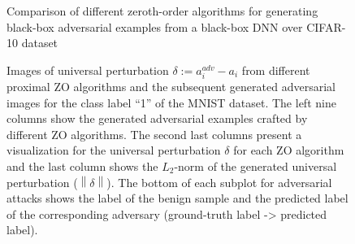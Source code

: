 \documentclass[iicol,sn-basic]{sn-jnl}
\theoremstyle{thmstyleone}%
\theoremstyle{thmstyletwo}%
\theoremstyle{thmstylethree}%
\newcommand{\norm}[1]{\left\lVert#1\right\rVert}
\begin{document}
\begin{figure}[hbt!]
\hfill%
%
\setlength{\abovecaptionskip}{2pt}
\caption{Comparison of different zeroth-order algorithms for generating black-box adversarial examples from a black-box DNN over CIFAR-10 dataset}
\label{attack-fig-cifar10}
\end{figure}

\begin{figure}[hbt!]
%
\setlength{\abovecaptionskip}{2pt}
\caption{Images of universal perturbation $\delta := a_i^{adv} - a_i$ from different proximal ZO algorithms and the subsequent generated adversarial images for the class label ``1'' of the MNIST dataset. The left nine columns show the generated adversarial examples crafted by different ZO algorithms. The second last columns present a visualization for the universal perturbation $\delta$ for each ZO algorithm and the last column shows the $L_2$-norm of the generated universal perturbation ($\norm{\delta}$). The bottom of each subplot for adversarial attacks shows the label of the benign sample and the predicted label of the corresponding adversary (ground-truth label -> predicted label).}
\label{attack-perturbs-fig}
\end{figure}
\end{document}
